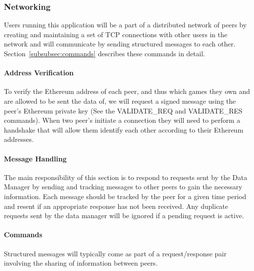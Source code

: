 \subsubsection*{Networking}

Users running this application will be a part of a distributed network of peers by creating and maintaining a set of TCP connections with other users in the network and will communicate by sending structured messages to each other. Section~\ref{subsubsec:commands} describes these commands in detail.

\paragraph*{Address Verification}

To verify the Ethereum address of each peer, and thus which games they own and are allowed to be sent the data of, we will request a signed message using the peer's Ethereum private key (See the VALIDATE\_REQ and VALIDATE\_RES commands).
\x
When two peer's initiate a connection they will need to perform a handshake that will allow them identify each other according to their Ethereum addresses. 

\paragraph*{Message Handling}

The main responsibility of this section is to respond to requests sent by the Data Manager by sending and tracking messages to other peers to gain the necessary information. Each message should be tracked by the peer for a given time period and resent if an appropriate response has not been received. Any duplicate requests sent by the data manager will be ignored if a pending request is active. 

\paragraph*{Commands}\label{subsubsec:commands}

Structured messages will typically come as part of a request/response pair involving the sharing of information between peers.

